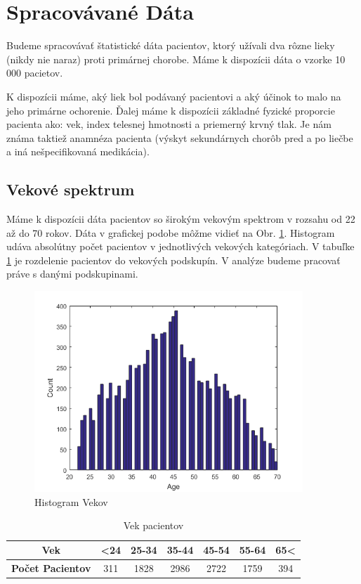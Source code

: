 \section{Spracovávané Dáta}

Budeme spracovávať štatistické dáta pacientov, ktorý užívali dva rôzne lieky (nikdy nie naraz) proti primárnej chorobe. Máme k dispozícii dáta o vzorke 10 000 pacietov.


K dispozícii máme, aký liek bol podávaný pacientovi a aký účinok to malo na jeho primárne ochorenie. Ďalej máme k dispozícii základné fyzické proporcie pacienta ako: vek, index telesnej hmotnosti a priemerný krvný tlak. Je nám známa taktiež anamnéza pacienta (výskyt sekundárnych chorôb pred a po liečbe a iná nešpecifikovaná medikácia).

\subsection{Vekové spektrum}

Máme k dispozícii dáta pacientov so širokým vekovým spektrom v rozsahu od 22 až do 70 rokov. Dáta v grafickej podobe môžme vidieť na Obr. \ref{fig:hist-vek}. Histogram udáva absolútny počet pacientov v jednotlivých vekových kategóriach. V tabuľke \ref{tab:vek} je rozdelenie pacientov do vekových podskupín. V analýze budeme pracovať práve s danými podskupinami.

\begin{figure}[h!]
	\centering
  		\includegraphics[width=0.9\textwidth]{ages.png}
  	\caption{Histogram Vekov}
  	\label{fig:hist-vek}
\end{figure}

\begin{table}[h!]
\centering
\label{vek}
\begin{tabular}{c|cccccc}
\hline
\textbf{Vek}             & \textless 24 & 25-34 & 35-44 & 45-54 & 55-64 & 65\textless \\ \hline
\textbf{Počet Pacientov} & 311 & 1828  & 2986  & 2722  & 1759  & 394 \\ \hline
\end{tabular}
\caption{Vek pacientov}
\label{tab:vek}
\end{table}

